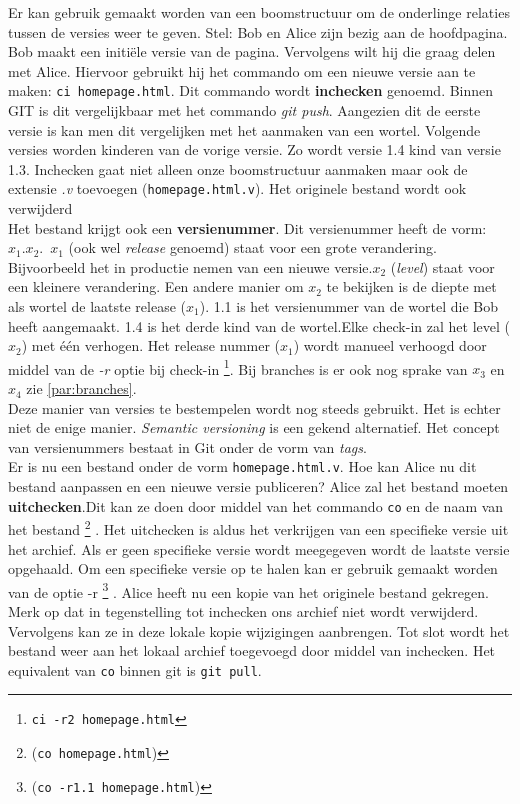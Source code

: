 Er kan gebruik gemaakt worden van een boomstructuur om de onderlinge relaties tussen de versies weer te geven. Stel: Bob en Alice zijn bezig aan de hoofdpagina. Bob maakt een initiële versie van de pagina. Vervolgens wilt hij die graag delen met Alice. Hiervoor gebruikt hij het commando om een nieuwe versie aan te maken: \Verb+ci homepage.html+. Dit commando wordt \textbf{inchecken} genoemd. Binnen GIT is dit vergelijkbaar met het commando \textit{git push}. Aangezien dit de eerste versie is kan men dit vergelijken met het aanmaken van een wortel. Volgende versies worden kinderen van de vorige versie. Zo wordt versie 1.4 kind van versie 1.3. Inchecken gaat niet alleen onze boomstructuur aanmaken maar ook de extensie \textit{.v} toevoegen (\verb+homepage.html.v+). Het originele bestand wordt ook verwijderd\\

Het bestand krijgt ook een \textbf{versienummer}. Dit versienummer heeft de vorm: $x_1.x_2$.\ $x_1$ (ook wel \textit{release} genoemd) staat voor een grote verandering. Bijvoorbeeld het in productie nemen van een nieuwe versie.$x_2$ (\textit{level}) staat voor een kleinere verandering. Een andere manier om $x_2$ te bekijken is de diepte met als wortel de laatste release ($x_1$). 1.1 is het versienummer van de wortel die Bob heeft aangemaakt. 1.4 is het derde kind van de wortel.Elke check-in zal het level ($x_2$) met één verhogen. Het release nummer ($x_1$) wordt manueel verhoogd door middel van de \textit{-r} optie bij check-in \footnote{\Verb+ci -r2 homepage.html+}. Bij branches is er ook nog sprake van $x_3$ en $x_4$ zie \ref{par:branches}.\\

Deze manier van versies te bestempelen wordt nog steeds gebruikt. Het is echter niet de enige manier. \textit{Semantic versioning} is een gekend alternatief. Het concept van versienummers bestaat in Git onder de vorm van \textit{tags}.\\

Er is nu een bestand onder de vorm \verb+homepage.html.v+. Hoe kan Alice nu dit bestand aanpassen en een nieuwe versie publiceren? Alice zal het bestand moeten \textbf{uitchecken}.Dit kan ze doen door middel van het commando \verb+co+ en de naam van het bestand \footnote{(\Verb+co homepage.html+)} . Het uitchecken is aldus het verkrijgen van een specifieke versie uit het archief. Als er geen specifieke versie wordt meegegeven wordt de laatste versie opgehaald. Om een specifieke versie op te halen kan er gebruik gemaakt worden van de optie -r  \footnote{(\Verb+co -r1.1 homepage.html+)} . Alice heeft nu een kopie van het originele bestand gekregen. Merk op dat in tegenstelling tot inchecken ons archief niet wordt verwijderd. Vervolgens kan ze in deze lokale kopie wijzigingen aanbrengen. Tot slot wordt het bestand weer aan het lokaal archief toegevoegd door middel van inchecken. Het equivalent van \verb+co+ binnen git is \verb+git pull+.\\

